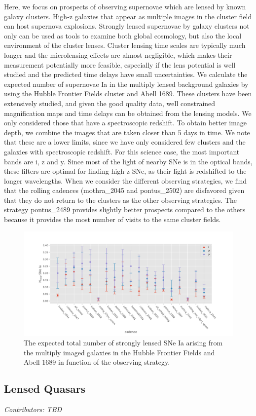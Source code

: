 Here, we focus on prospects of observing supernovae which are
lensed by known galaxy clusters. High-z galaxies that appear as
multiple images in the cluster field can host supernova
explosions. Strongly lensed supernovae by galaxy clusters not only
can be used as tools to examine both global cosmology, but also
the local environment of the cluster lenses. Cluster lensing time
scales are typically much longer and the microlensing effects are
almost negligible, which makes their measurement potentially more
feasible, especially if the lens potential is well studied and the
predicted time delays have small uncertainties. We calculate the
expected number of supernovae Ia in the multiply lensed background
galaxies by using the Hubble Frontier Fields cluster and Abell
1689. These clusters have been extensively studied, and given the
good quality data, well constrained magnification maps and time
delays can be obtained from the lensing models. We only considered
those that have a spectroscopic redshift. To obtain better image
depth, we combine the images that are taken closer than 5 days in
time. We note that these are a lower limits, since we have only
considered few clusters and the galaxies with spectroscopic
redshift. For this science case, the most important bands are i, z
and y. Since most of the light of nearby SNe is in the optical
bands, these filters are optimal for finding high-z SNe, as their
light is redshifted to the longer wavelengths. When we consider
the different observing strategies, we find that the rolling
cadences (mothra\_2045 and pontus\_2502) are disfavored given that
they do not return to the clusters as the other observing
strategies. The strategy pontus\_2489 provides slightly better
prospects compared to the others because it provides the most
number of visits to the same cluster fields.

\begin{figure}
\centering
\includegraphics[scale=0.65]{figures/galaxy_lensing.pdf}
\caption{The expected total number of strongly lensed SNe Ia arising from the multiply imaged galaxies in the Hubble Frontier Fields and Abell 1689 in function of the observing strategy. }
\end{figure}


\subsection{Lensed Quasars}
\textit{Contributors: TBD}



\FloatBarrier


